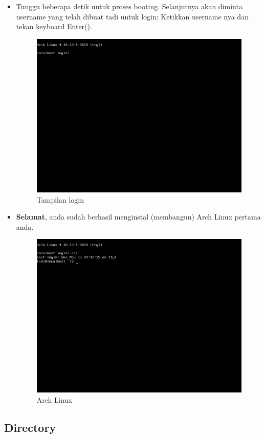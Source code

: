 \documentclass[12pt,]{article}
\begin{document}
\begin{itemize}
		\item Tunggu beberapa detik untuk proses booting.
		Selanjutnya akan diminta username yang telah dibuat tadi untuk login:
		Ketikkan username nya dan tekan keyboard Enter(\keys{\return}).
		\begin{figure}[H]
			\centering
			\includegraphics[width=0.4\linewidth]{images/vbox_afterinstall/s4}
			\caption{Tampilan login}
		\end{figure}
	
		\item \textbf{Selamat}, anda sudah berhasil menginstal (membangun) Arch Linux pertama anda.
			\begin{figure}[H]
			\centering
			\includegraphics[width=0.4\linewidth]{images/vbox_afterinstall/s5}
			\caption{Arch Linux}
		\end{figure}
	\end{itemize} 

	\subsection{Directory}	
	
\end{document}
